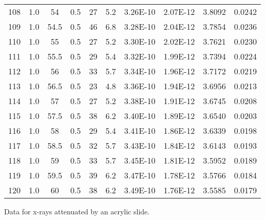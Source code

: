 \begin{maintable}[ht]
\begin{tabular}{cccccccccc}
108       & 1.0 & 54       & 0.5         & 27    & 5.2      & 3.26E-10      & 2.07E-12         & 3.8092       & 0.0242 \\
109       & 1.0 & 54.5     & 0.5         & 46    & 6.8      & 3.28E-10      & 2.04E-12         & 3.7854       & 0.0236 \\
110       & 1.0 & 55       & 0.5         & 27    & 5.2      & 3.30E-10      & 2.02E-12         & 3.7621       & 0.0230 \\
111       & 1.0 & 55.5     & 0.5         & 29    & 5.4      & 3.32E-10      & 1.99E-12         & 3.7394       & 0.0224 \\
112       & 1.0 & 56       & 0.5         & 33    & 5.7      & 3.34E-10      & 1.96E-12         & 3.7172       & 0.0219 \\
113       & 1.0 & 56.5     & 0.5         & 23    & 4.8      & 3.36E-10      & 1.94E-12         & 3.6956       & 0.0213 \\
114       & 1.0 & 57       & 0.5         & 27    & 5.2      & 3.38E-10      & 1.91E-12         & 3.6745       & 0.0208 \\
115       & 1.0 & 57.5     & 0.5         & 38    & 6.2      & 3.40E-10      & 1.89E-12         & 3.6540       & 0.0203 \\
116       & 1.0 & 58       & 0.5         & 29    & 5.4      & 3.41E-10      & 1.86E-12         & 3.6339       & 0.0198 \\
117       & 1.0 & 58.5     & 0.5         & 32    & 5.7      & 3.43E-10      & 1.84E-12         & 3.6143       & 0.0193 \\
118       & 1.0 & 59       & 0.5         & 33    & 5.7      & 3.45E-10      & 1.81E-12         & 3.5952       & 0.0189 \\
119       & 1.0 & 59.5     & 0.5         & 39    & 6.2      & 3.47E-10      & 1.78E-12         & 3.5766       & 0.0184 \\
120       & 1.0 & 60       & 0.5         & 38    & 6.2      & 3.49E-10      & 1.76E-12         & 3.5585       & 0.0179         
\end{tabular}
\caption{Data for x-rays attenuated by an acrylic slide.}
\label{tab:xrcg6}
\end{maintable}

\AtEndDocument{\clearpage\ifodd\value{page}\else\null\clearpage\fi} %


